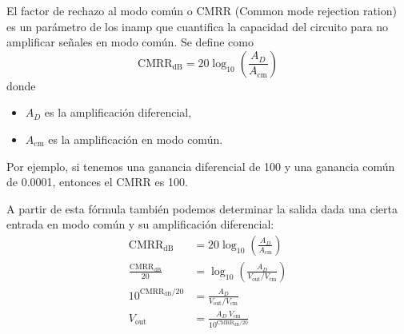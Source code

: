 El factor de rechazo al modo común o CMRR (Common mode rejection ration) es un parámetro de los inamp que cuantifica la capacidad del circuito para no amplificar señales en modo común. Se define como 
\[
  \text{CMRR}_\text{dB} = 20\log_{10}\left(\frac{A_D}{A_\text{cm}}\right)
\]
donde 
\begin{itemize}
  \item \(A_D\) es la amplificación diferencial,
  \item \(A_\text{cm}\) es la amplificación en modo común.
\end{itemize}
Por ejemplo, si tenemos una ganancia diferencial de 100 y una ganancia común de 0.0001, entonces el CMRR es 100.

A partir de esta fórmula también podemos determinar la salida dada una cierta entrada en modo común y su amplificación diferencial:
\begin{align*}
  \text{CMRR}_\text{dB} &= 20 \log_{10}\left(\frac{A_D}{A_\text{cm}}\right) \\ 
  \frac{\text{CMRR}_\text{dB}}{20} &= \log_{10}\left(\frac{A_D}{V_\text{out}/V_\text{cm}}\right) \\ 
  10^{\text{CMRR}_\text{dB}/20} &= \frac{A_D}{V_\text{out}/V_\text{cm}} \\ 
  V_\text{out} &= \frac{A_D~ V_\text{cm}}{10^{\text{CMRR}_\text{dB}/20}} \\ 
\end{align*}
